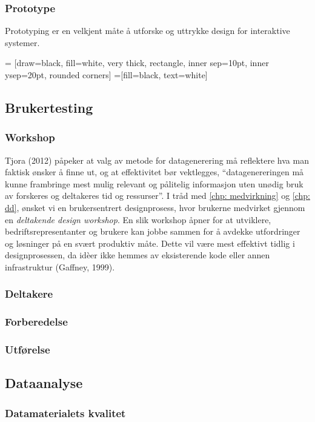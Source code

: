  
\subsubsection{Prototype}
Prototyping er en velkjent måte å utforske og uttrykke design for interaktive systemer. 

 = [draw=black, fill=white, very thick,
    rectangle, inner sep=10pt, inner ysep=20pt, rounded corners]
 =[fill=black, text=white]
%


\subsection{Brukertesting}
\subsubsection{Workshop}
Tjora (2012) påpeker at valg av metode for datagenerering må reflektere hva man faktisk ønsker å finne ut, og at effektivitet bør vektlegges, “datagenereringen må kunne frambringe mest mulig relevant og pålitelig informasjon uten unødig bruk av forskeres og deltakeres tid og ressurser”.
I tråd med \ref{chp: medvirkning} og \ref{chp: dd}, ønsket vi en brukersentrert designprosess, hvor brukerne medvirket gjennom en \emph{deltakende design workshop}.
En slik workshop åpner for at utviklere, bedriftsrepresentanter og brukere kan jobbe sammen for å avdekke utfordringer og løsninger på en svært produktiv måte. Dette vil være mest effektivt tidlig i designprosessen, da idèer ikke hemmes av eksisterende kode eller annen infrastruktur (Gaffney, 1999).

\subsubsection{Deltakere}
\subsubsection{Forberedelse}
\subsubsection{Utførelse}

\subsection{Dataanalyse}

\subsubsection{Datamaterialets kvalitet}

